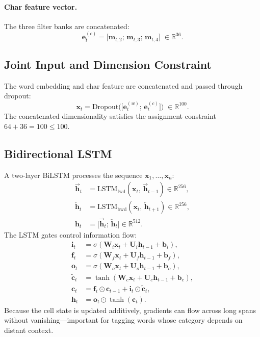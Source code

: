 \documentclass[11pt]{article}
\begin{document}
\paragraph{Char feature vector.}
The three filter banks are concatenated:
\begin{equation}
  \mathbf{e}_t^{(c)} =
    \bigl[\mathbf{m}_{t,2};\, \mathbf{m}_{t,3};\, \mathbf{m}_{t,4}\bigr]
    \;\in \mathbb{R}^{36}.
\end{equation}

\subsection{Joint Input and Dimension Constraint}

The word embedding and char feature are concatenated and passed through
dropout:
\begin{equation}
  \mathbf{x}_t =
    \mathrm{Dropout}\!\bigl(\bigl[\mathbf{e}_t^{(w)};\, \mathbf{e}_t^{(c)}\bigr]\bigr)
    \;\in \mathbb{R}^{100}.
\end{equation}
The concatenated dimensionality satisfies the assignment constraint
$64 + 36 = 100 \leq 100$.

\subsection{Bidirectional LSTM}

A two-layer BiLSTM processes the sequence $\mathbf{x}_1, \ldots, \mathbf{x}_n$:
\begin{align}
  \overrightarrow{\mathbf{h}}_t
    &= \mathrm{LSTM}_{\!\text{fwd}}\!\left(
        \mathbf{x}_t,\,\overrightarrow{\mathbf{h}}_{t-1}
       \right) \in \mathbb{R}^{256}, \\
  \overleftarrow{\mathbf{h}}_t
    &= \mathrm{LSTM}_{\!\text{bwd}}\!\left(
        \mathbf{x}_t,\,\overleftarrow{\mathbf{h}}_{t+1}
       \right) \in \mathbb{R}^{256}, \\
  \mathbf{h}_t
    &= \bigl[\overrightarrow{\mathbf{h}}_t;\, \overleftarrow{\mathbf{h}}_t\bigr]
       \in \mathbb{R}^{512}.
\end{align}
The LSTM gates control information flow:
\begin{align}
  \mathbf{i}_t &= \sigma(\mathbf{W}_i \mathbf{x}_t + \mathbf{U}_i \mathbf{h}_{t-1} + \mathbf{b}_i), \\
  \mathbf{f}_t &= \sigma(\mathbf{W}_f \mathbf{x}_t + \mathbf{U}_f \mathbf{h}_{t-1} + \mathbf{b}_f), \\
  \mathbf{o}_t &= \sigma(\mathbf{W}_o \mathbf{x}_t + \mathbf{U}_o \mathbf{h}_{t-1} + \mathbf{b}_o), \\
  \tilde{\mathbf{c}}_t &= \tanh(\mathbf{W}_c \mathbf{x}_t + \mathbf{U}_c \mathbf{h}_{t-1} + \mathbf{b}_c), \\
  \mathbf{c}_t &= \mathbf{f}_t \odot \mathbf{c}_{t-1} + \mathbf{i}_t \odot \tilde{\mathbf{c}}_t, \\
  \mathbf{h}_t &= \mathbf{o}_t \odot \tanh(\mathbf{c}_t).
\end{align}
Because the cell state is updated additively, gradients can flow across long
spans without vanishing---important for tagging words whose category depends
on distant context.
\end{document}
